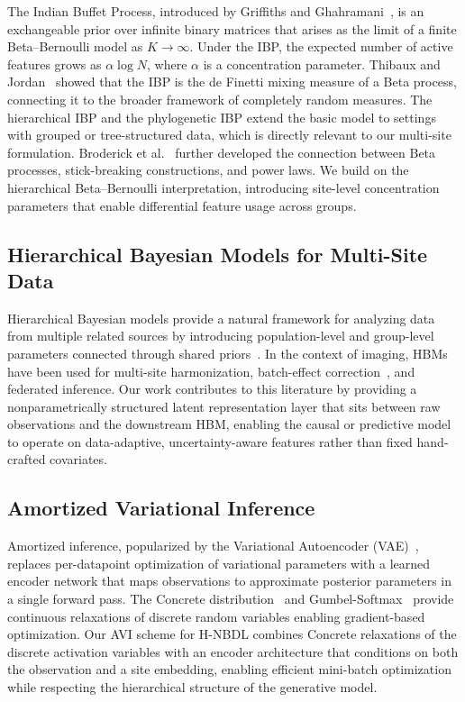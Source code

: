 \documentclass[11pt,a4paper]{article}
\theoremstyle{definition}
\begin{document}
The Indian Buffet Process, introduced by Griffiths and Ghahramani~\citep{griffiths2011}, is an exchangeable prior over infinite binary matrices that arises as the limit of a finite Beta--Bernoulli model as $K \to \infty$. Under the IBP, the expected number of active features grows as $\alpha \log N$, where $\alpha$ is a concentration parameter. Thibaux and Jordan~\citep{thibaux2007} showed that the IBP is the de Finetti mixing measure of a Beta process, connecting it to the broader framework of completely random measures. The hierarchical IBP and the phylogenetic IBP extend the basic model to settings with grouped or tree-structured data, which is directly relevant to our multi-site formulation. Broderick et al.~\citep{broderick2012} further developed the connection between Beta processes, stick-breaking constructions, and power laws. We build on the hierarchical Beta--Bernoulli interpretation, introducing site-level concentration parameters that enable differential feature usage across groups.

\subsection{Hierarchical Bayesian Models for Multi-Site Data}

Hierarchical Bayesian models provide a natural framework for analyzing data from multiple related sources by introducing population-level and group-level parameters connected through shared priors~\citep{gelman2006}. In the context of imaging, HBMs have been used for multi-site harmonization, batch-effect correction~\citep{fortin2017,johnson2007}, and federated inference. Our work contributes to this literature by providing a nonparametrically structured latent representation layer that sits between raw observations and the downstream HBM, enabling the causal or predictive model to operate on data-adaptive, uncertainty-aware features rather than fixed hand-crafted covariates.

\subsection{Amortized Variational Inference}

Amortized inference, popularized by the Variational Autoencoder (VAE)~\citep{kingma2014}, replaces per-datapoint optimization of variational parameters with a learned encoder network that maps observations to approximate posterior parameters in a single forward pass. The Concrete distribution~\citep{maddison2017} and Gumbel-Softmax~\citep{jang2017} provide continuous relaxations of discrete random variables enabling gradient-based optimization. Our AVI scheme for H-NBDL combines Concrete relaxations of the discrete activation variables with an encoder architecture that conditions on both the observation and a site embedding, enabling efficient mini-batch optimization while respecting the hierarchical structure of the generative model.
\end{document}

